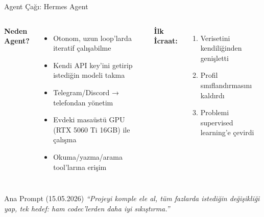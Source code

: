 \documentclass[10pt,aspectratio=43]{beamer}
\begin{document}
\begin{frame}{Agent Çağı: Hermes Agent}
  \begin{columns}[T]
    \textbf{Neden Agent?}
    \vspace{0.3em}
    \begin{itemize}
      \setlength{\itemsep}{0.4em}
      \item Otonom, uzun loop'larda iteratif çalışabilme
      \item Kendi API key'ini getirip istediğin modeli takma
      \item Telegram/Discord → telefondan yönetim
      \item Evdeki masaüstü GPU (RTX 5060 Ti 16GB) ile çalışma
      \item Okuma/yazma/arama tool'larına erişim
    \end{itemize}

    \textbf{İlk İcraat:}
    \vspace{0.3em}
    \begin{enumerate}
      \setlength{\itemsep}{0.4em}
      \item Verisetini \alert{kendiliğinden} genişletti
      \item Profil sınıflandırmasını \alert{kaldırdı}
      \item Problemi supervised learning'e çevirdi
    \end{enumerate}
  \end{columns}

  \vspace{0.5em}
  \begin{exampleblock}{Ana Prompt (15.05.2026)}
    \textit{``Projeyi komple ele al, tüm fazlarda istediğin değişikliği yap, tek hedef: ham codec'lerden daha iyi sıkıştırma.''}
  \end{exampleblock}
\end{frame}
\end{document}
